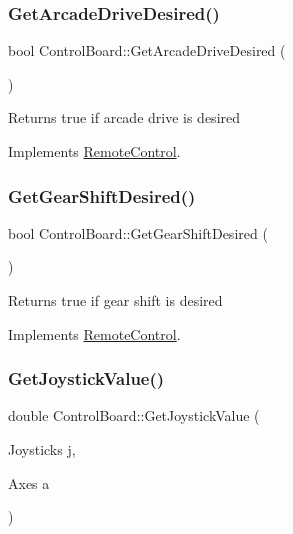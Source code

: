 \subsubsection{\texorpdfstring{Get\+Arcade\+Drive\+Desired()}{GetArcadeDriveDesired()}}
{\footnotesize\ttfamily bool Control\+Board\+::\+Get\+Arcade\+Drive\+Desired (\begin{DoxyParamCaption}{ }\end{DoxyParamCaption})\hspace{0.3cm}{\ttfamily [virtual]}}

\begin{DoxyReturn}{Returns}
true if arcade drive is desired 
\end{DoxyReturn}


Implements \hyperlink{class_remote_control}{Remote\+Control}.

\mbox{\label{class_control_board_a49f9d98f58c8f8eb8030910c27b187ed}} 
\subsubsection{\texorpdfstring{Get\+Gear\+Shift\+Desired()}{GetGearShiftDesired()}}
{\footnotesize\ttfamily bool Control\+Board\+::\+Get\+Gear\+Shift\+Desired (\begin{DoxyParamCaption}{ }\end{DoxyParamCaption})\hspace{0.3cm}{\ttfamily [virtual]}}

\begin{DoxyReturn}{Returns}
true if gear shift is desired 
\end{DoxyReturn}


Implements \hyperlink{class_remote_control}{Remote\+Control}.

\mbox{\label{class_control_board_a82d4f6abff67ad0ba60b263d65fcc924}} 
\subsubsection{\texorpdfstring{Get\+Joystick\+Value()}{GetJoystickValue()}}
{\footnotesize\ttfamily double Control\+Board\+::\+Get\+Joystick\+Value (\begin{DoxyParamCaption}\item[{Joysticks}]{j,  }\item[{Axes}]{a }\end{DoxyParamCaption})\hspace{0.3cm}{\ttfamily [virtual]}}

